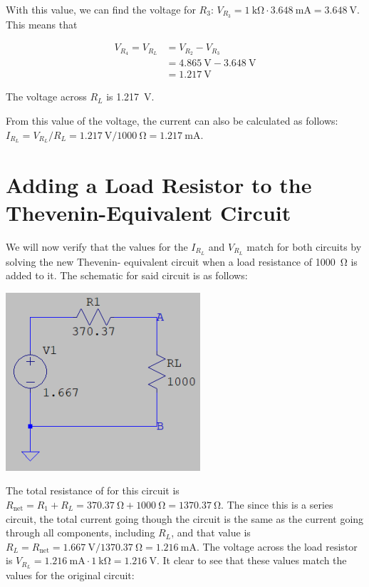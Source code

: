 \documentclass{article}
\begin{document}
With this value, we can find the voltage for \(R_3\):
\(V_{R_3} = \SI{1}{\kilo\ohm} \cdot \SI{3.648}{\milli\ampere}
= \SI{3.648}{\volt}\). This means that

\begin{align*}
    V_{R_4} = V_{R_L}
    &= V_{R_2} - V_{R_3}\\
    &= \SI{4.865}{\volt} - \SI{3.648}{\volt}\\
    &= \SI{1.217}{\volt}
\end{align*}

The voltage across \(R_L\) is \SI{1.217}{\volt}.

From this value of the voltage, the current can also be
calculated as follows:
\(I_{R_L} = V_{R_L} / R_L = \SI{1.217}{\volt} / \SI{1000}{\ohm}
= \SI{1.217}{\milli\ampere}\).

\section{Adding a Load Resistor to the Thevenin-Equivalent Circuit}
We will now verify that the values for the \(I_{R_L}\) and
\(V_{R_L}\) match for both circuits by solving the new Thevenin-
equivalent circuit when a load resistance of \SI{1000}{\ohm}
is added to it. The schematic for said circuit is as follows:

\includegraphics{Images/Thevenin_RL.png}

The total resistance of for this circuit is
\(R_\text{net} = R_1 + R_L = \SI{370.37}{\ohm} + \SI{1000}{\ohm}
= \SI{1370.37}{\ohm}\). The since this is a series circuit, the
total current going though the circuit is the same as the
current going through all components, including \(R_L\), and
that value is \(R_L = R_\text{net} = \SI{1.667}{\volt} / \SI{1370.37}{\ohm}
= \SI{1.216}{\milli\ampere}\). The voltage across the load
resistor is \(V_{R_L} = \SI{1.216}{\milli\ampere}\cdot\SI{1}{\kilo\ohm}
= \SI{1.216}{\volt}\). It clear to see that these values match
the values for the original circuit:
\end{document}

